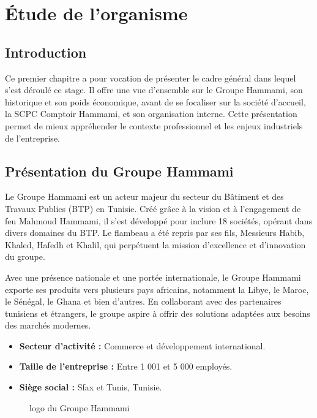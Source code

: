 \chapter{Étude de l'organisme}

\section*{Introduction}
Ce premier chapitre a pour vocation de présenter le cadre général dans lequel s'est déroulé ce stage. Il offre une vue d'ensemble sur le Groupe Hammami, son historique et son poids économique, avant de se focaliser sur la société d'accueil, la SCPC Comptoir Hammami, et son organisation interne. Cette présentation permet de mieux appréhender le contexte professionnel et les enjeux industriels de l'entreprise.

\section{Présentation du Groupe Hammami}
Le Groupe Hammami est un acteur majeur du secteur du Bâtiment et des Travaux Publics (BTP) en Tunisie. Créé grâce à la vision et à l'engagement de feu Mahmoud Hammami, il s'est développé pour inclure 18 sociétés, opérant dans divers domaines du BTP. Le flambeau a été repris par ses fils, Messieurs Habib, Khaled, Hafedh et Khalil, qui perpétuent la mission d'excellence et d'innovation du groupe.

Avec une présence nationale et une portée internationale, le Groupe Hammami exporte ses produits vers plusieurs pays africains, notamment la Libye, le Maroc, le Sénégal, le Ghana et bien d'autres. En collaborant avec des partenaires tunisiens et étrangers, le groupe aspire à offrir des solutions adaptées aux besoins des marchés modernes.

\begin{itemize}
    \item \textbf{Secteur d’activité :} Commerce et développement international.
    \item \textbf{Taille de l’entreprise :} Entre 1 001 et 5 000 employés.
    \item \textbf{Siège social :} Sfax et Tunis, Tunisie.
\end{itemize}

\begin{figure}[H]
    \centering
    \caption{logo du Groupe Hammami}
    \label{fig:logo_groupe}
\end{figure}

